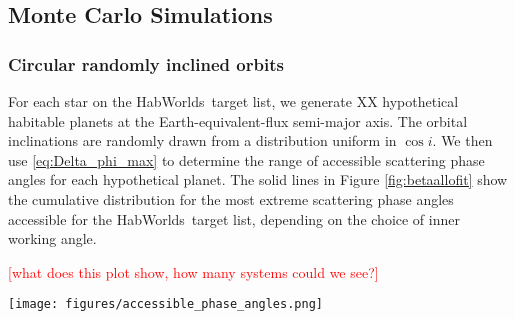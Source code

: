 \documentclass[
    usenatbib,
]{mnras}
\newcommand{\todo}[1]{\textcolor{red}{[#1]}}
\newcommand{\timmy}[1]{\textcolor{red}{[\textbf{Timmy:} #1]}} %
\newcommand{\hwo}{HabWorlds}
\begin{document}




\subsection{Monte Carlo Simulations}

\subsubsection{Circular randomly inclined orbits}
\label{sec:circular}

For each star on the \hwo\ target list, we generate XX hypothetical habitable planets at the Earth-equivalent-flux semi-major axis. 
%
The orbital inclinations are randomly drawn from a distribution uniform in $\cos i$. 
%
We then use \cref{eq:Delta_phi_max} to determine the range of accessible scattering phase angles for each hypothetical planet. 
The solid lines in Figure \ref{fig:betaallofit} show the cumulative distribution for the most extreme scattering phase angles accessible for the \hwo\ target list, depending on the choice of inner working angle.  

\todo{what does this plot show, how many systems could we see?}


\begin{figure*}[t]
    \centering
    \texttt{[image: figures/accessible\_phase\_angles.png]}  
    \caption{
        The big kahuna
        \timmy{What are the dashed vs. solid lines?}
        \timmy{How did this plot aggregate the simulations for each planet? mean? median? min/max?
        }
    }
    \label{fig:betaallofit}
\end{figure*}
\end{document}
